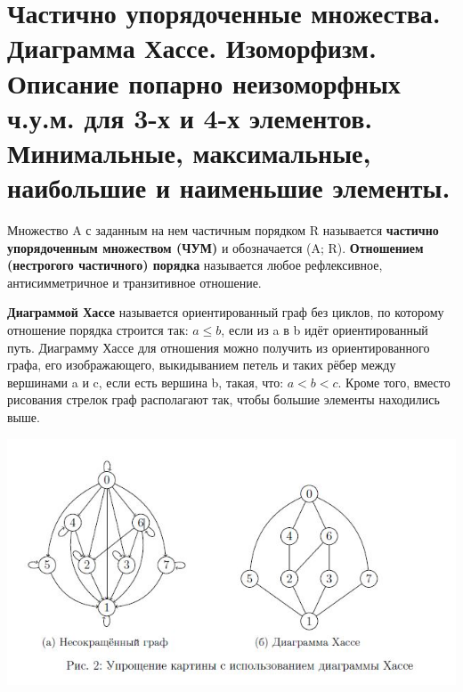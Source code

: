 \setcounter{section}{18}

\section{Частично упорядоченные множества. Диаграмма Хассе. Изоморфизм. Описание попарно неизоморфных ч.у.м. для 3-х и 4-х элементов. Минимальные, максимальные, наибольшие и наименьшие элементы.}

Множество A с заданным на нем частичным порядком R называется \textbf{частично упорядоченным множеством (ЧУМ)} и обозначается (A; R). \textbf{Отношением (нестрогого частичного) порядка} называется любое рефлексивное, антисимметричное и транзитивное отношение. \\ \par

\textbf{Диаграммой Хассе} называется ориентированный граф без циклов, по которому отношение порядка строится так: $a \leqslant b$, если из a в b идёт ориентированный путь. Диаграмму Хассе для отношения можно получить из ориентированного графа, его изображающего, выкидыванием петель и таких рёбер между вершинами a и c, если есть вершина b, такая, что: $a < b < c$. Кроме того, вместо рисования стрелок граф располагают так, чтобы большие элементы находились выше. \par
\includegraphics{images/19_hasse} \par

